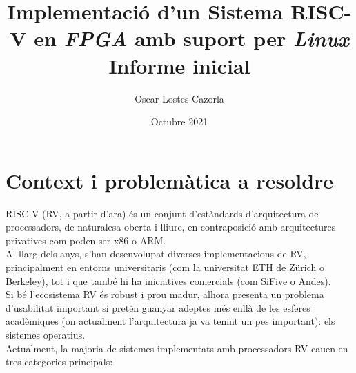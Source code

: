 \documentclass{article}
\begin{document}
\nocite{*}

\title{\textbf{Implementació d'un Sistema RISC-V en \textit{FPGA} amb suport per \textit{Linux}} \\
Informe inicial}
\author{Oscar Lostes Cazorla}
\date{Octubre 2021}

\clearpage\maketitle
\thispagestyle{empty}

\newpage

\section{Context i problemàtica a resoldre} 

RISC-V (RV, a partir d'ara) és un conjunt d'estàndards d'arquitectura de processadors, de naturalesa oberta i lliure, en contraposició amb arquitectures privatives com poden ser x86 o ARM.\\

Al llarg dels anys, s'han desenvolupat diverses implementacions de RV, principalment en entorns universitaris (com la universitat ETH de Zürich o Berkeley), tot i que també hi ha iniciatives comercials (com SiFive o Andes).\\

Si bé l'ecosistema RV és robust i prou madur, alhora presenta un problema d'usabilitat important si pretén guanyar adeptes més enllà de les esferes acadèmiques (on actualment l'arquitectura ja va tenint un pes important): els sistemes operatius.\\

Actualment, la majoria de sistemes implementats amb processadors RV cauen en tres categories principals:
\end{document}
